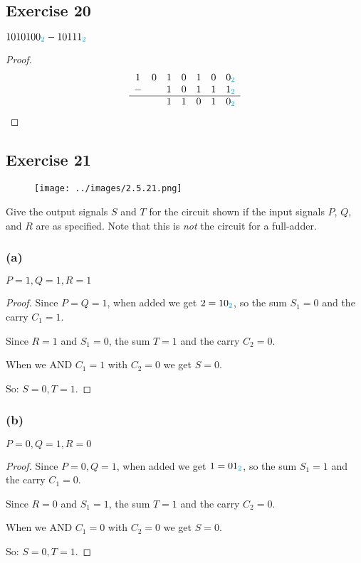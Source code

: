 \documentclass[14pt]{extarticle}
\newcommand{\base}[1]{{\color{cyan}#1}}
\begin{document}
\subsection{Exercise 20}
$1010100_\base{2} - 10111_\base{2}$

\begin{proof}
    $$
        \begin{array}{ccccccc}
            1 & 0 & 1 & 0 & 1 & 0 & 0_\base{2} \\
            - &   & 1 & 0 & 1 & 1 & 1_\base{2} \\
            \hline
              &   & 1 & 1 & 0 & 1 & 0_\base{2} \\
        \end{array}
    $$
\end{proof}

\subsection{Exercise 21}
\begin{figure}[ht!]
    \centering
    \texttt{[image: ../images/2.5.21.png]}
\end{figure}

Give the output signals $S$ and $T$ for the circuit shown if the input signals $P$, $Q$, and $R$ are as specified. Note that this is {\it not} the circuit for a full-adder.

\subsubsection{(a)}
$P = 1, Q = 1, R = 1$

\begin{proof}
    Since $P = Q = 1$, when added we get $2 = 10_\base{2}$, so the sum $S_1 = 0$ and the carry $C_1 = 1$.

    Since $R = 1$ and $S_1 = 0$, the sum $T = 1$ and the carry $C_2 = 0$.

    When we AND $C_1 = 1$ with $C_2 = 0$ we get $S = 0$.

    So: $S = 0, T = 1$.
\end{proof}

\subsubsection{(b)}
$P = 0, Q = 1, R = 0$

\begin{proof}
    Since $P = 0, Q = 1$, when added we get $1 = 01_\base{2}$, so the sum $S_1 = 1$ and the carry $C_1 = 0$.

    Since $R = 0$ and $S_1 = 1$, the sum $T = 1$ and the carry $C_2 = 0$.

    When we AND $C_1 = 0$ with $C_2 = 0$ we get $S = 0$.

    So: $S = 0, T = 1$.
\end{proof}
\end{document}
